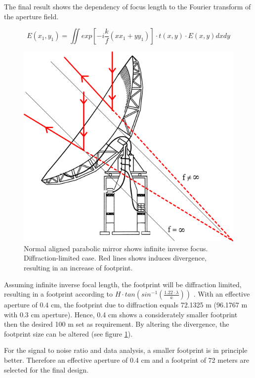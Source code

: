 The final result shows the dependency of focus length to the Fourier transform of the aperture field. 

\begin{equation} 
E(x_{1},y_{1})=\iint exp\left[-i\frac{k}{f}\left(xx_{1}+yy_{1}\right)\right]\cdot t(x,y)\cdot E(x,y) dx dy
\end{equation}


\begin{figure} [ht]
\centering
\includegraphics[scale=0.4]{chapters/img/optic_focus.png}	
\caption{Normal aligned parabolic mirror shows infinite inverse focus. Diffraction-limited case. Red lines shows induces divergence, resulting in an increase of footprint.}
\label{diff_div}
\end{figure}

Assuming infinite inverse focal length, the footprint will be diffraction limited, resulting in a footprint according to $H\cdot tan(sin^{-1}(\frac{1.22\cdot \lambda}{a}))$ \cite{fourieroptics}. With an effective aperture of 0.4 cm, the footprint due to diffraction equals 72.1325 m (96.1767 m with 0.3 cm aperture). Hence, 0.4 cm shows a considerately smaller footprint then the desired 100 m set as requirement. By altering the divergence, the footprint size can be altered (see figure \ref{diff_div}).

For the signal to noise ratio and data analysis, a smaller footprint is in principle better. Therefore an effective aperture of 0.4 cm and a footprint of 72 meters are selected for the final design.
 
